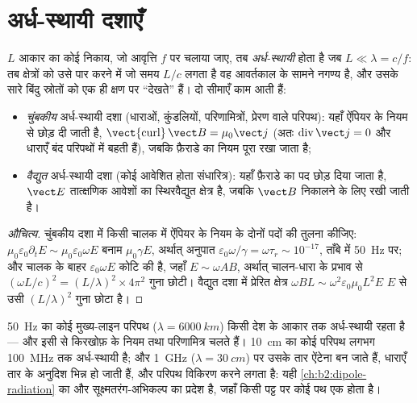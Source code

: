 \section{अर्ध-स्थायी दशाएँ}

\begin{definition}[अर्ध-स्थायी सन्निकटन]\label{def:b2:maxwell-equations:arqs}
$L$ आकार का कोई निकाय, जो आवृत्ति $f$ पर चलाया जाए, तब \emph{अर्ध-स्थायी}
होता है जब $L \ll \lambda = c/f$: तब क्षेत्रों को उसे पार करने में जो समय $L/c$
लगता है वह आवर्तकाल के सामने नगण्य है, और उसके सारे बिंदु स्रोतों को
एक ही क्षण पर ``देखते'' हैं। दो सीमाएँ काम आती हैं:
\begin{itemize}
  \item \emph{चुंबकीय} अर्ध-स्थायी दशा (धाराओं, कुंडलियों, परिणामित्रों,
        प्रेरण वाले परिपथ): यहाँ ऐंपियर के नियम से  छोड़ दी जाती है, $\operatorname{\vect{curl}}\vect B
        = \mu_0\vect j$ (अतः $\operatorname{div}\vect j = 0$ और धाराएँ बंद
        परिपथों में बहती हैं), जबकि फ़ैराडे का नियम पूरा रखा जाता है;
  \item \emph{वैद्युत} अर्ध-स्थायी दशा (कोई आवेशित होता
        संधारित्र): यहाँ फ़ैराडे का पद छोड़ दिया जाता है, $\vect E$ तात्क्षणिक
        आवेशों का स्थिरवैद्युत क्षेत्र है, जबकि $\vect B$ निकालने के लिए
         रखी जाती है।
\end{itemize}
\end{definition}

\begin{proof}[औचित्य]
चुंबकीय दशा में किसी चालक में ऐंपियर के नियम के दोनों पदों की तुलना
कीजिए: $\mu_0\varepsilon_0\partial_t E \sim \mu_0\varepsilon_0\omega E$ बनाम $\mu_0\gamma E$,
अर्थात् अनुपात $\varepsilon_0\omega/\gamma = \omega\tau_r \sim 10^{-17}$, ताँबे में \qty{50}{Hz} पर;
और चालक के बाहर 
$\varepsilon_0\omega E$ कोटि की है, जहाँ $E \sim \omega AB$, अर्थात् चालन-धारा के
प्रभाव से $(\omega L/c)^2 = (L/\lambda)^2 \times 4\pi^2$ गुना छोटी। वैद्युत
दशा में प्रेरित क्षेत्र $\omega BL \sim \omega^2\varepsilon_0\mu_0L^2E$ $E$ से उसी
$(L/\lambda)^2$ गुना छोटा है।
\end{proof}

\begin{example}[परिपथ और ऐंटेना]\label{ex:b2:maxwell-equations:sizes}
\qty{50}{Hz} का कोई मुख्य-लाइन परिपथ ($\lambda = \qty{6000}{km}$) किसी देश के
आकार तक अर्ध-स्थायी रहता है --- और इसी से किरखोफ़ के नियम तथा
परिणामित्र चलते हैं। \qty{10}{cm} का कोई परिपथ लगभग
\qty{100}{MHz} तक अर्ध-स्थायी है; और \qty{1}{GHz} ($\lambda = \qty{30}{cm}$) पर उसके तार ऐंटेना बन जाते हैं,
धाराएँ तार के अनुदिश भिन्न हो जाती हैं, और परिपथ विकिरण करने लगता है: यही
\cref{ch:b2:dipole-radiation} का और सूक्ष्मतरंग-अभिकल्प का प्रदेश है, जहाँ किसी पट्ट पर
कोई पथ एक  होता है।
\end{example}

